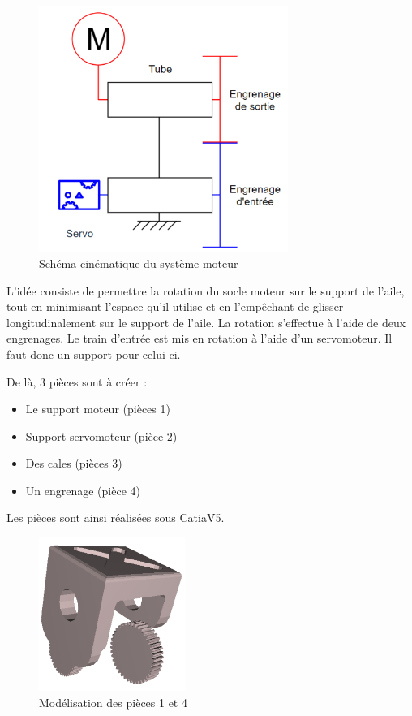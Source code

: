 \documentclass[a4paper,12pt,french]{report}
\begin{document}
\begin{figure}[h]
    \centering
    \includegraphics[height=8cm]{figures/cinemot.jpeg}
    \caption{Schéma cinématique du système moteur}
\end{figure}

L’idée consiste de permettre la rotation du socle moteur sur le support de l’aile, tout en minimisant l’espace qu’il utilise et en l’empêchant de glisser longitudinalement sur le support de l’aile. La rotation s’effectue à l’aide de deux engrenages. Le train d’entrée est mis en rotation à l’aide d’un servomoteur. Il faut donc un support pour celui-ci.\newline

De là, 3 pièces sont à créer :
\begin{itemize}
    \item Le support moteur (pièces 1)
    \item Support servomoteur (pièce 2)
    \item Des cales (pièces 3)
    \item Un engrenage (pièce 4)\newline
\end{itemize}

Les pièces sont ainsi réalisées sous CatiaV5.

\begin{figure}[h]
    \centering
    \includegraphics[height=5cm]{figures/mot1.png}
    \caption{Modélisation des pièces 1 et 4}
\end{figure}
\end{document}
